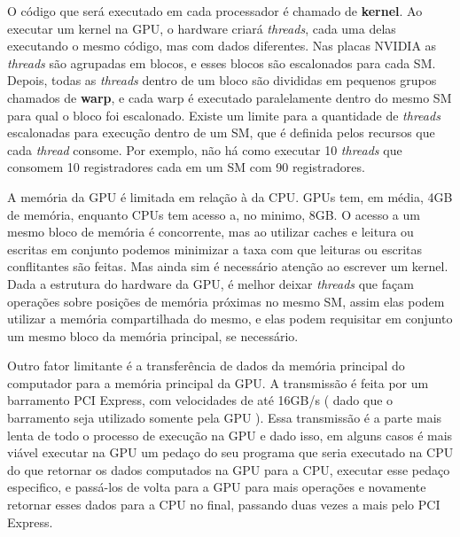    O código que será executado em cada processador é chamado de \textbf{kernel}. Ao executar um kernel na GPU, o 
hardware criará \textit{threads}, cada uma delas executando o mesmo código, mas com dados diferentes. Nas placas NVIDIA as \textit{threads} 
são agrupadas em blocos, e esses blocos são escalonados para cada SM. Depois, todas as \textit{threads} dentro de um bloco são 
divididas em pequenos grupos chamados de \textbf{warp}, e cada warp é executado paralelamente dentro do 
mesmo SM para qual o bloco foi escalonado. Existe um limite para a quantidade de \textit{threads} escalonadas para execução
dentro de um SM, que é definida pelos recursos que cada \textit{thread} consome. Por exemplo, não há como executar 10 \textit{threads}
que consomem 10 registradores cada em um SM com 90 registradores.

    A memória da GPU é limitada em relação à da CPU. GPUs tem, em média, 4GB
de memória, enquanto CPUs tem acesso a, no minimo, 8GB. O acesso a um mesmo bloco de memória é concorrente, mas ao utilizar caches e leitura 
ou escritas em conjunto podemos minimizar a taxa com que leituras ou escritas conflitantes são feitas. Mas ainda sim é 
necessário atenção ao escrever um kernel. Dada a estrutura do hardware da GPU, é melhor deixar \textit{threads} que façam 
operações sobre posições de memória próximas no mesmo SM, assim elas podem utilizar a memória compartilhada do mesmo, e 
elas podem requisitar em conjunto um mesmo bloco da memória principal, se necessário.

    Outro fator limitante é a transferência de dados da memória principal do computador para a memória 
principal da GPU. A transmissão é feita por um barramento PCI Express, com velocidades de até 16GB/s ( dado que o
barramento seja utilizado somente pela GPU ). Essa transmissão é a parte mais lenta de todo o
processo de execução na GPU e dado isso, em alguns casos é mais viável executar na GPU um pedaço do seu programa que 
seria executado na CPU do que retornar os dados computados na GPU para a CPU, executar esse pedaço especifico, e 
passá-los de volta para a GPU para mais operações e novamente retornar esses dados para a CPU no final, passando duas 
vezes a mais pelo PCI Express.

